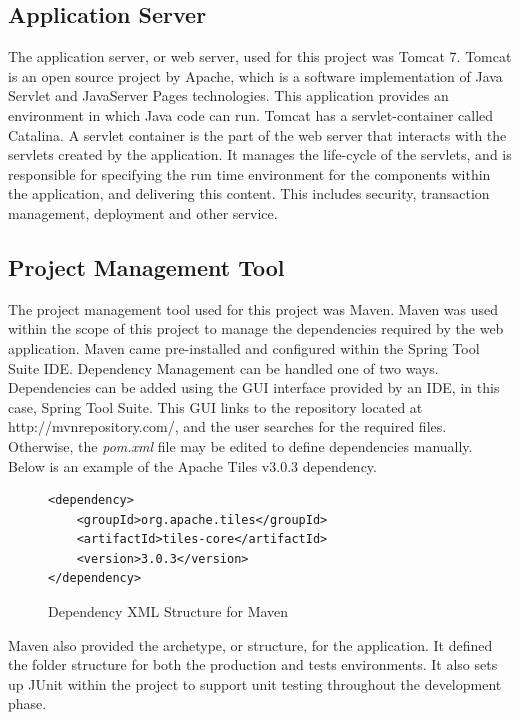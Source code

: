 \subsection{Application Server}

The application server, or web server, used for this project was Tomcat 7.  Tomcat is an open source project by Apache, which is a software implementation of Java Servlet and JavaServer Pages technologies. This application provides an environment in which Java code can run. Tomcat has a servlet-container called Catalina. A servlet container is the part of the web server that interacts with the servlets created by the application. It manages the life-cycle of the servlets, and is responsible for specifying the run time environment for the components within the application, and delivering this content. This includes security, transaction management, deployment and other service. 

\subsection{Project Management Tool}

The project management tool used for this project was Maven. Maven was used within the scope of this project to manage the dependencies required by the web application. Maven came pre-installed and configured within the Spring Tool Suite IDE. Dependency Management can be handled one of two ways. Dependencies can be added using the GUI interface provided by an IDE, in this case, Spring Tool Suite. This GUI links to the repository located at http://mvnrepository.com/, and the user searches for the required files. Otherwise, the \textit{pom.xml} file may be edited to define dependencies manually. Below is an example of the Apache Tiles v3.0.3 dependency.

\begin{figure}[H]
\begin{lstlisting}
<dependency>
	<groupId>org.apache.tiles</groupId>
	<artifactId>tiles-core</artifactId>
	<version>3.0.3</version>
</dependency>
\end{lstlisting}
\caption{Dependency XML Structure for Maven}
\end{figure}

Maven also provided the archetype, or structure, for the application. It defined the folder structure for both the production and tests environments. It also sets up JUnit within the project to support unit testing throughout the development phase.

